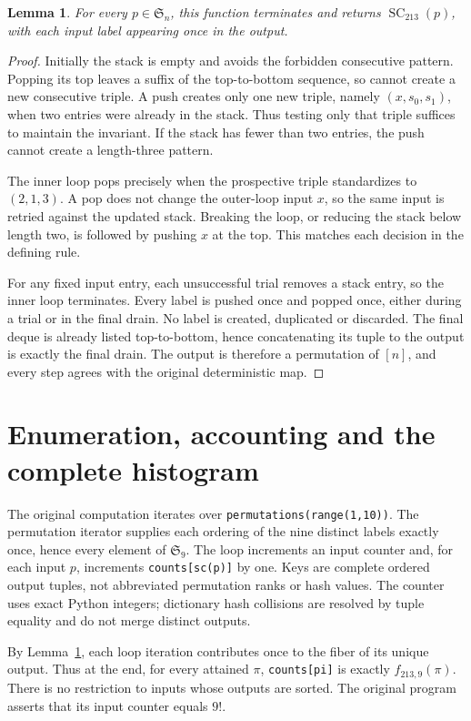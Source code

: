 \documentclass[11pt,a4paper]{article}
\newtheorem{lemma}{Lemma}
\newcommand{\SC}{\operatorname{SC}}
\newcommand{\Sn}{\mathfrak S_n}
\begin{document}
\begin{lemma}\label{lem:implementation}
For every $p\in\Sn$, this function terminates and returns $\SC_{213}(p)$,
with each input label appearing once in the output.
\end{lemma}
\begin{proof}
Initially the stack is empty and avoids the forbidden consecutive
pattern. Popping its top leaves a suffix of the top-to-bottom sequence,
so cannot create a new consecutive triple. A push creates only one
new triple, namely $(x,s_0,s_1)$, when two entries were already in the
stack. Thus testing only that triple suffices to maintain the invariant.
If the stack has fewer than two entries, the push cannot create a
length-three pattern.

The inner loop pops precisely when the prospective triple standardizes
to $(2,1,3)$. A pop does not change the outer-loop input $x$, so the
same input is retried against the updated stack. Breaking the loop,
or reducing the stack below length two, is followed by pushing $x$
at the top. This matches each decision in the defining rule.

For any fixed input entry, each unsuccessful trial removes a stack
entry, so the inner loop terminates. Every label is pushed once and
popped once, either during a trial or in the final drain. No label is
created, duplicated or discarded. The final deque is already listed
top-to-bottom, hence concatenating its tuple to the output is exactly
the final drain. The output is therefore a permutation of $[n]$, and
every step agrees with the original deterministic map.
\end{proof}

\section{Enumeration, accounting and the complete histogram}
The original computation iterates over
\texttt{permutations(range(1,10))}. The permutation iterator supplies
each ordering of the nine distinct labels exactly once, hence every
element of $\mathfrak S_9$. The loop increments an input counter and,
for each input $p$, increments \texttt{counts[sc(p)]} by one. Keys are
complete ordered output tuples, not abbreviated permutation ranks or
hash values. The counter uses exact Python integers; dictionary hash
collisions are resolved by tuple equality and do not merge distinct
outputs.

By Lemma~\ref{lem:implementation}, each loop iteration contributes once
to the fiber of its unique output. Thus at the end, for every attained
$\pi$, \texttt{counts[pi]} is exactly $f_{213,9}(\pi)$. There is no
restriction to inputs whose outputs are sorted. The original program
asserts that its input counter equals $9!$.
\end{document}
